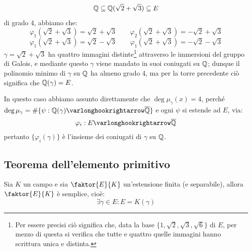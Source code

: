 \documentclass[11pt]{scrartcl}
\begin{document}
\begin{example}
    \[ \mathbb Q \subseteq \mathbb Q(\sqrt{2} + \sqrt{3}) \subseteq E
        \]
    di grado 4, abbiamo che:
    \[ \varphi_1(\sqrt{2}+\sqrt{3}) = \sqrt{2} + \sqrt{3} \qquad \varphi_2(\sqrt{2}+\sqrt{3}) = -\sqrt{2} + \sqrt{3}
        \]\[ \varphi_1(\sqrt{2}+\sqrt{3}) = \sqrt{2} - \sqrt{3} \qquad \varphi_1(\sqrt{2}+\sqrt{3}) = - \sqrt{2} - \sqrt{3}
            \]
    $\gamma = \sqrt{2}+\sqrt{3}$ ha quattro immagini distinte\footnote{Per essere precisi ciò significa che, data
    la base $\{1,\sqrt2,\sqrt3,\sqrt6\}$ di $E$, per mezzo di questa si verifica che tutte e quattro quelle immagini hanno scrittura unica e distinta.}
    attraverso le immersioni del gruppo di Galois, e mediante questo $\gamma$ viene mandato in suoi coniugati su $\mathbb Q$;
    dunque il polinomio minimo di $\gamma$ su $\mathbb Q$ ha almeno grado 4, ma per la torre precedente ciò significa che $\mathbb Q(\gamma) = E$.
\end{example}

\begin{remark}
    In questo caso abbiamo assunto direttamente che $\deg \mu_\gamma (x) = 4$, perché $\deg \mu_\gamma = \#\{\psi : \QQ(\gamma) \varlonghookrightarrow \ol\QQ\}$ e ogni $\psi$ si 
    estende ad $E$, via:
    \[ \varphi_i : E \varlonghookrightarrow \ol \QQ
        \]
    pertanto $\{\varphi_i(\gamma)\}$ è l'insieme dei coniugati di $\gamma$ su $\mathbb Q$.
\end{remark}

\newpage
\subsection{Teorema dell'elemento primitivo}
\begin{theorem}
    \label{prim}
    Sia $K$ un campo e sia $\faktor{E}{K}$ un'estensione finita (e separabile), allora $\faktor{E}{K}$ è semplice, cioè:
    \[ \exists\gamma \in E : E = K(\gamma)
        \] 
\end{theorem}
\end{document}
